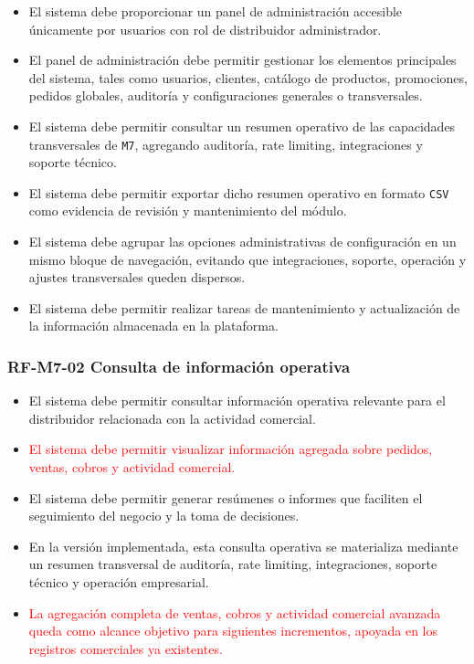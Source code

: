 \begin{itemize}
    \item El sistema debe proporcionar un panel de administración accesible únicamente por usuarios con rol de distribuidor administrador.
    \item El panel de administración debe permitir gestionar los elementos principales del sistema, tales como usuarios, clientes, catálogo de productos, promociones, pedidos globales, auditoría y configuraciones generales o transversales.
    \item El sistema debe permitir consultar un resumen operativo de las capacidades transversales de \texttt{M7}, agregando auditoría, rate limiting, integraciones y soporte técnico.
    \item El sistema debe permitir exportar dicho resumen operativo en formato \texttt{CSV} como evidencia de revisión y mantenimiento del módulo.
    \item El sistema debe agrupar las opciones administrativas de configuración en un mismo bloque de navegación, evitando que integraciones, soporte, operación y ajustes transversales queden dispersos.
    \item El sistema debe permitir realizar tareas de mantenimiento y actualización de la información almacenada en la plataforma.
\end{itemize}

\vspace{-0.75em}
\subsubsection{RF-M7-02 Consulta de información operativa}
\vspace{-1em}

\begin{itemize}
    \item El sistema debe permitir consultar información operativa relevante para el distribuidor relacionada con la actividad comercial.
    \item \textcolor{red}{El sistema debe permitir visualizar información agregada sobre pedidos, ventas, cobros y actividad comercial.}
    \item El sistema debe permitir generar resúmenes o informes que faciliten el seguimiento del negocio y la toma de decisiones.
    \item En la versión implementada, esta consulta operativa se materializa mediante un resumen transversal de auditoría, rate limiting, integraciones, soporte técnico y operación empresarial.
    \item \textcolor{red}{La agregación completa de ventas, cobros y actividad comercial avanzada queda como alcance objetivo para siguientes incrementos, apoyada en los registros comerciales ya existentes.}
\end{itemize}

